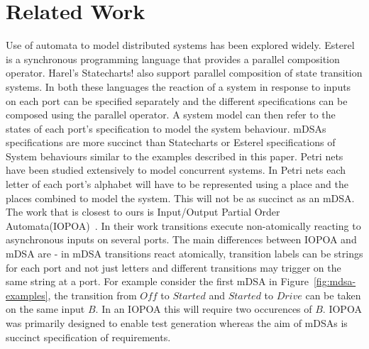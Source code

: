 \section{Related Work}
Use of automata to model distributed systems has been explored widely.
Esterel~\cite{DBLP:journals/scp/BerryG92} is a synchronous programming language
that provides a parallel composition operator. Harel's
Statecharts!\cite{DBLP:journals/scp/Harel87} also support parallel composition
of state transition systems. In both these languages the reaction of a system
in response to inputs on each port can be specified separately and the
different specifications can be composed using the parallel operator. A system
model can then refer to the states of each port's specification to model the
system behaviour. mDSAs specifications are more succinct than Statecharts or Esterel specifications of System behaviours similar to the examples described in this
paper. Petri nets~\cite{CAPetri}
have been studied extensively to model concurrent systems. In Petri nets each
letter of each port's alphabet will have to be represented using a place and
the places combined to model the system. This will not be as succinct as an
mDSA. 
The work that is closest to ours is Input/Output Partial Order
Automata(IOPOA)~\cite{10.5555/2391293.2391305}. In their work transitions
execute non-atomically reacting to asynchronous inputs on several ports. The
main differences between IOPOA and mDSA are - in mDSA transitions react
atomically, transition labels can be strings for each port and not just letters
and different transitions may trigger on the same string at a port. For example consider the first mDSA in Figure~\ref{fig:mdsa-examples}, the transition from $Off$ to $Started$ and $Started$ to $Drive$ can be taken on the same input $B$. In an IOPOA this will require two occurences of $B$. IOPOA was primarily designed to enable test generation whereas the aim of mDSAs is succinct specification of requirements.
